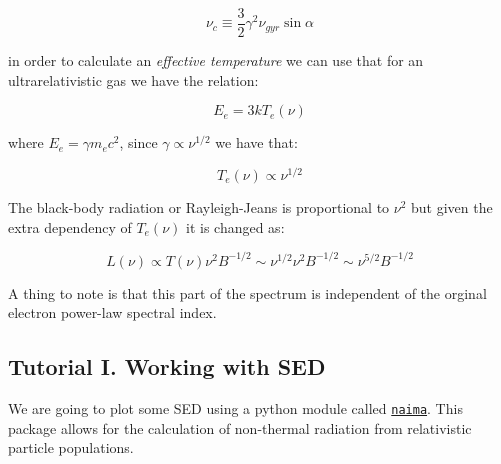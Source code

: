 \documentclass[
  letterpaper,
  DIV=11,
  numbers=noendperiod]{scrreprt}
\begin{document}
\[\nu_c \equiv \frac{3}{2}\gamma^2\nu_{gyr} \sin \alpha\]

in order to calculate an \emph{effective temperature} we can use that
for an ultrarelativistic gas we have the relation:

\[E_e = 3kT_e(\nu)\]

where \(E_e = \gamma m_e c^2\), since \(\gamma \propto \nu^{1/2}\) we
have that:

\[T_e(\nu) \propto \nu^{1/2}\]

The black-body radiation or Rayleigh-Jeans is proportional to \(\nu^2\)
but given the extra dependency of \(T_e(\nu)\) it is changed as:

\[L(\nu) \propto T(\nu) \nu^2 B^{-1/2} \sim \nu^{1/2}\nu^{2}B^{-1/2} \sim \nu^{5/2} B^{-1/2}\]

A thing to note is that this part of the spectrum is independent of the
orginal electron power-law spectral index.

\subsection{Tutorial I. Working with
SED}\label{tutorial-i.-working-with-sed}

We are going to plot some SED using a python module called
\href{https://github.com/zblz/naima}{\texttt{naima}}. This package
allows for the calculation of non-thermal radiation from relativistic
particle populations.
\end{document}
